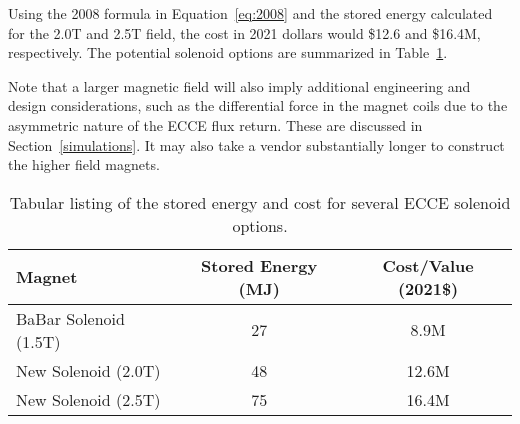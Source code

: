 Using the 2008 formula in Equation~\ref{eq:2008} and the stored energy calculated for the 2.0T and 2.5T field, the cost in 2021 dollars would \$12.6 and \$16.4M, respectively. The potential solenoid options are summarized in Table~\ref{tab:magoptions}. 

Note that a larger magnetic field will also imply additional engineering and design considerations, such as the differential force in the magnet coils due to the asymmetric nature of the ECCE flux return.  These are discussed in Section~\ref{simulations}. It may also take a vendor substantially longer to construct the higher field magnets. 

\begin{table}[h!tbp]
    \centering
    \begin{tabular}{lcc}
        \hline
                     Magnet    & Stored Energy (MJ) &  Cost/Value (2021\$) \\ [0.5ex]
         \hline
         BaBar Solenoid (1.5T) & 27 & 8.9M \\       
         New Solenoid (2.0T)   & 48 & 12.6M \\
         New Solenoid (2.5T)   & 75 & 16.4M \\
         \hline
    \end{tabular}{}
     \caption{Tabular listing of the stored energy and cost for several ECCE solenoid options.}
    \label{tab:magoptions}
\end{table}


